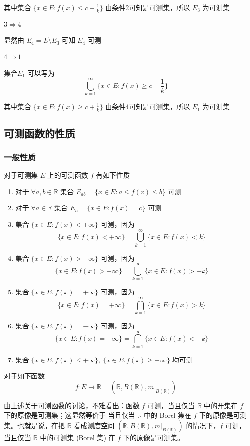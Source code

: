 \documentclass{ctexbook}
\newcommand{\no}{\noindent}
\newcommand{\R}{\mathbb{R}}
\newcommand{\ITEMS}{\begin{enumerate}[leftmargin=4em]}
\newcommand{\ITEME}{\end{enumerate}}
\begin{document}
其中集合 $\{ x\in E: f(x) \le c-\frac1k\}$ 由条件2可知是可测集，所以 $E_3$ 为可测集
\smallskip

\no$3\Rightarrow4$

显然由 $E_4 = E\setminus E_3$ 可知 $E_4$ 可测
\smallskip

\no$4\Rightarrow1$

集合$E_1$ 可以写为
\[\bigcup\limits_{k=1} ^\infty \{ x\in E: f(x) \ge c+\frac1k\}\]

其中集合 $\{ x\in E: f(x) \ge c+\frac1k\}$ 由条件4可知是可测集，所以 $E_1$ 为可测集

\subsection{可测函数的性质}

\subsubsection{一般性质}

对于可测集 $E$ 上的可测函数 $f$ 有如下性质
\ITEMS
\item 对于 $\forall a,b \in \R$ 集合 $E_{ab}=\{x\in E : a\le f(x) \le b\}$ 可测
\item 对于 $\forall a \in \R$ 集合 $E_{a}=\{x\in E : f(x) = a\}$ 可测
\item 集合 $\{x\in E : f(x) < +\infty\}$ 可测，因为
\[
\{x\in E : f(x) < +\infty\} = \bigcup_{k=1}^\infty\{x\in E: f(x) < k\}
\]
\item 集合 $\{x\in E : f(x) > -\infty\}$ 可测，因为
\[
\{x\in E : f(x) > -\infty\} = \bigcup_{k=1}^\infty\{x\in E: f(x) > -k\}
\]
\item 集合 $\{x\in E : f(x) = +\infty\}$ 可测，因为
\[
\{x\in E : f(x) = +\infty\} = \bigcap_{k=1}^\infty\{x\in E: f(x) > k\}
\]
\item 集合 $\{x\in E : f(x) = -\infty\}$ 可测，因为
\[
\{x\in E : f(x) = -\infty\} = \bigcap_{k=1}^\infty\{x\in E: f(x) < -k\}
\]
\item 集合 $\{x\in E : f(x) \le +\infty\},\ \{x\in E : f(x) \ge -\infty\}$ 均可测
\ITEME

\no {\bf 注：}

对于如下函数
\[
f:E \to \R = (\R, B(\R), m|_{B(\R)})
\]

由上述关于可测函数的讨论，不难看出：函数 $f$ 可测，当且仅当 $\R$ 中的开集在 $f$ 下的原像是可测集；这显然等价于
当且仅当 $\R$ 中的 Borel 集在 $f$ 下的原像是可测集。也就是说，在把 $\R$ 看成测度空间 $(\R, B(\R), m|_{B(\R)})$ 的情况下，$f$ 可测，当且仅当 $\R$ 中的可测集 (Borel 集) 在 $f$ 下的原像是可测集。
\end{document}
